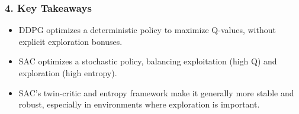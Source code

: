 \documentclass[12pt]{article}
\begin{document}
\subsubsection*{4. Key Takeaways}
\begin{itemize}
    \item DDPG optimizes a deterministic policy to maximize Q-values, without explicit exploration bonuses.
    \item SAC optimizes a stochastic policy, balancing exploitation (high Q) and exploration (high entropy).
    \item SAC's twin-critic and entropy framework make it generally more stable and robust, especially in environments where exploration is important.
\end{itemize}
\end{document}
